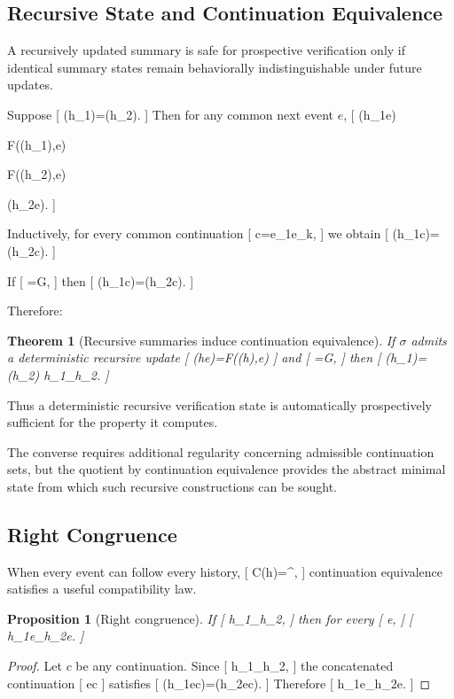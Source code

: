 \documentclass[11pt]{article}
\newtheorem{theorem}{Theorem} \newtheorem{proposition}{Proposition} \newtheorem{lemma}{Lemma} \newtheorem{corollary}{Corollary} \newtheorem{definition}{Definition} \newtheorem{remark}{Remark}
\begin{document}
\subsection{Recursive State and Continuation Equivalence}

A recursively updated summary is safe for prospective verification only if identical summary states remain behaviorally indistinguishable under future updates.

Suppose
[
\sigma(h_1)=\sigma(h_2).
]
Then for any common next event $e$,
[
\sigma(h_1e)

F(\sigma(h_1),e)

F(\sigma(h_2),e)

\sigma(h_2e).
]

Inductively, for every common continuation
[
c=e_1\cdots e_k,
]
we obtain
[
\sigma(h_1c)=\sigma(h_2c).
]

If
[
\Phi=G\circ\sigma,
]
then
[
\Phi(h_1c)=\Phi(h_2c).
]

Therefore:

\begin{theorem}[Recursive summaries induce continuation equivalence]
If $\sigma$ admits a deterministic recursive update
[
\sigma(he)=F(\sigma(h),e)
]
and
[
\Phi=G\circ\sigma,
]
then
[
\sigma(h_1)=\sigma(h_2)
\Longrightarrow
h_1\equiv_\Phi h_2.
]
\end{theorem}

Thus a deterministic recursive verification state is automatically prospectively sufficient for the property it computes.

The converse requires additional regularity concerning admissible continuation sets, but the quotient by continuation equivalence provides the abstract minimal state from which such recursive constructions can be sought.

\subsection{Right Congruence}

When every event can follow every history,
[
\mathcal C(h)=\Sigma^\ast,
]
continuation equivalence satisfies a useful compatibility law.

\begin{proposition}[Right congruence]
If
[
h_1\equiv_\Phi h_2,
]
then for every
[
e\in\Sigma,
]
[
h_1e\equiv_\Phi h_2e.
]
\end{proposition}

\begin{proof}
Let $c$ be any continuation. Since
[
h_1\equiv_\Phi h_2,
]
the concatenated continuation
[
ec
]
satisfies
[
\Phi(h_1ec)=\Phi(h_2ec).
]
Therefore
[
h_1e\equiv_\Phi h_2e.
]
\end{proof}
\end{document}
